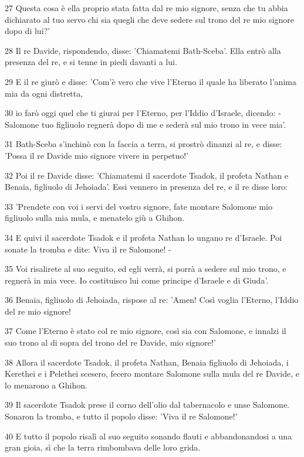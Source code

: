 \par 27 Questa cosa è ella proprio stata fatta dal re mio signore, senza che tu abbia dichiarato al tuo servo chi sia quegli che deve sedere sul trono del re mio signore dopo di lui?'
\par 28 Il re Davide, rispondendo, disse: 'Chiamatemi Bath-Sceba'. Ella entrò alla presenza del re, e si tenne in piedi davanti a lui.
\par 29 E il re giurò e disse: 'Com'è vero che vive l'Eterno il quale ha liberato l'anima mia da ogni distretta,
\par 30 io farò oggi quel che ti giurai per l'Eterno, per l'Iddio d'Israele, dicendo: - Salomone tuo figliuolo regnerà dopo di me e sederà sul mio trono in vece mia'.
\par 31 Bath-Sceba s'inchinò con la faccia a terra, si prostrò dinanzi al re, e disse: 'Possa il re Davide mio signore vivere in perpetuo!'
\par 32 Poi il re Davide disse: 'Chiamatemi il sacerdote Tsadok, il profeta Nathan e Benaia, figliuolo di Jehoiada'. Essi vennero in presenza del re, e il re disse loro:
\par 33 'Prendete con voi i servi del vostro signore, fate montare Salomone mio figliuolo sulla mia mula, e menatelo giù a Ghihon.
\par 34 E quivi il sacerdote Tsadok e il profeta Nathan lo ungano re d'Israele. Poi sonate la tromba e dite: Viva il re Salomone! -
\par 35 Voi risalirete al suo seguito, ed egli verrà, si porrà a sedere sul mio trono, e regnerà in mia vece. Io costituisco lui come principe d'Israele e di Giuda'.
\par 36 Benaia, figliuolo di Jehoiada, rispose al re: 'Amen! Così voglia l'Eterno, l'Iddio del re mio signore!
\par 37 Come l'Eterno è stato col re mio signore, così sia con Salomone, e innalzi il suo trono al di sopra del trono del re Davide, mio signore!'
\par 38 Allora il sacerdote Tsadok, il profeta Nathan, Benaia figliuolo di Jehoiada, i Kerethei e i Pelethei scesero, fecero montare Salomone sulla mula del re Davide, e lo menarono a Ghihon.
\par 39 Il sacerdote Tsadok prese il corno dell'olio dal tabernacolo e unse Salomone. Sonaron la tromba, e tutto il popolo disse: 'Viva il re Salomone!'
\par 40 E tutto il popolo risalì al suo seguito sonando flauti e abbandonandosi a una gran gioia, sì che la terra rimbombava delle loro grida.
